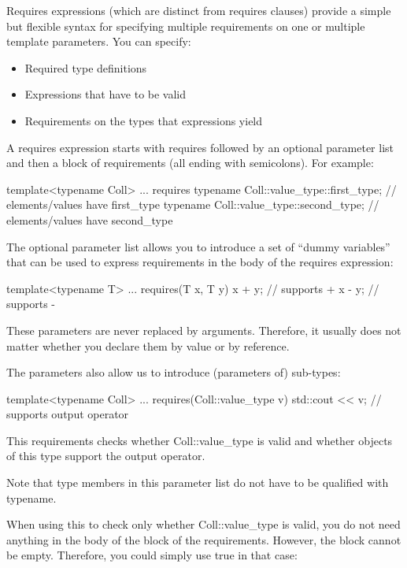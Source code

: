 

Requires expressions (which are distinct from requires clauses) provide a simple but flexible syntax for specifying multiple requirements on one or multiple template parameters. You can specify:

\begin{itemize}
\item
Required type definitions

\item
Expressions that have to be valid

\item
Requirements on the types that expressions yield
\end{itemize}

A requires expression starts with requires followed by an optional parameter list and then a block of requirements (all ending with semicolons). For example:

\begin{cpp}
template<typename Coll>
... requires {
		typename Coll::value_type::first_type; // elements/values have first_type
		typename Coll::value_type::second_type; // elements/values have second_type
	}
\end{cpp}

The optional parameter list allows you to introduce a set of “dummy variables” that can be used to express requirements in the body of the requires expression:

\begin{cpp}
template<typename T>
... requires(T x, T y) {
		x + y; // supports +
		x - y; // supports -
	}
\end{cpp}

These parameters are never replaced by arguments. Therefore, it usually does not matter whether you declare them by value or by reference.

The parameters also allow us to introduce (parameters of) sub-types:

\begin{cpp}
template<typename Coll>
... requires(Coll::value_type v) {
		std::cout << v; // supports output operator
	}
\end{cpp}

This requirements checks whether Coll::value\_type is valid and whether objects of this type support the output operator.

Note that type members in this parameter list do not have to be qualified with typename.

When using this to check only whether Coll::value\_type is valid, you do not need anything in the body of the block of the requirements. However, the block cannot be empty. Therefore, you could simply use true in that case:

